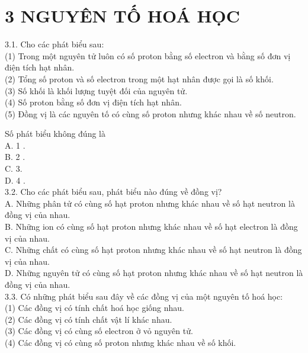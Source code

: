 \documentclass[10pt]{article}
\begin{document}
\section*{3 NGUYÊN TỐ HOÁ HỌC}
3.1. Cho các phát biểu sau:\\
(1) Trong một nguyên tử luôn có số proton bằng số electron và bằng số đơn vị điện tích hạt nhân.\\
(2) Tổng số proton và số electron trong một hạt nhân được gọi là số khối.\\
(3) Số khối là khối lượng tuyệt đối của nguyên tử.\\
(4) Số proton bằng số đơn vị điện tích hạt nhân.\\
(5) Đồng vị là các nguyên tố có cùng số proton nhưng khác nhau về số neutron.

Số phát biểu không đúng là\\
A. 1 .\\
B. 2 .\\
C. 3.\\
D. 4 .\\
3.2. Cho các phát biểu sau, phát biểu nào đúng về đồng vị?\\
A. Những phân tử có cùng số hạt proton nhưng khác nhau về số hạt neutron là đồng vị của nhau.\\
B. Những ion có cùng số hạt proton nhưng khác nhau về số hạt electron là đồng vị của nhau.\\
C. Những chất có cùng số hạt proton nhưng khác nhau về số hạt neutron là đồng vị của nhau.\\
D. Những nguyên tử có cùng số hạt proton nhưng khác nhau về số hạt neutron là đồng vị của nhau.\\
3.3. Có những phát biểu sau đây về các đồng vị của một nguyên tố hoá học:\\
(1) Các đồng vị có tính chất hoá học giống nhau.\\
(2) Các đồng vị có tính chất vật lí khác nhau.\\
(3) Các đồng vị có cùng số electron ở vỏ nguyên tử.\\
(4) Các đồng vị có cùng số proton nhưng khác nhau về số khối.
\end{document}
